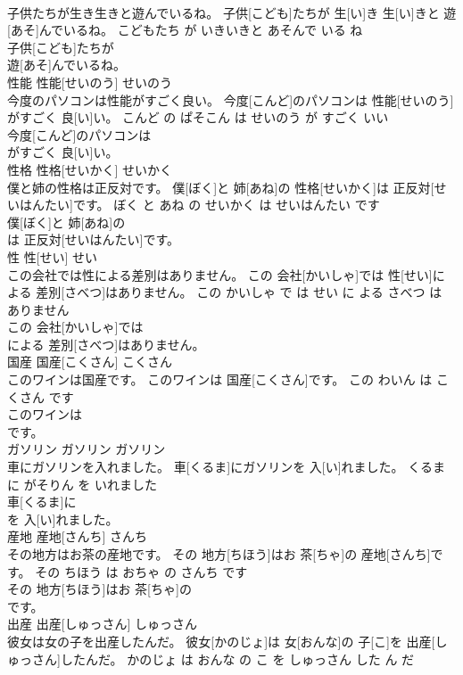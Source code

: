 \documentclass[8pt]{extreport}
\begin{document}
\begin{CJK}{UTF8}{min}
\\	子供たちが生き生きと遊んでいるね。	子供[こども]たちが 生[い]き 生[い]きと 遊[あそ]んでいるね。	こどもたち が いきいきと あそんで いる ね	
\\	子供[こども]たちが
\\	遊[あそ]んでいるね。			
\\	性能	性能[せいのう]	せいのう	
\\	今度のパソコンは性能がすごく良い。	今度[こんど]のパソコンは 性能[せいのう]がすごく 良[い]い。	こんど の ぱそこん は せいのう が すごく いい	
\\	今度[こんど]のパソコンは
\\	がすごく 良[い]い。			
\\	性格	性格[せいかく]	せいかく	
\\	僕と姉の性格は正反対です。	僕[ぼく]と 姉[あね]の 性格[せいかく]は 正反対[せいはんたい]です。	ぼく と あね の せいかく は せいはんたい です	
\\	僕[ぼく]と 姉[あね]の
\\	は 正反対[せいはんたい]です。			
\\	性	性[せい]	せい	
\\	この会社では性による差別はありません。	この 会社[かいしゃ]では 性[せい]による 差別[さべつ]はありません。	この かいしゃ で は せい に よる さべつ は ありません	
\\	この 会社[かいしゃ]では
\\	による 差別[さべつ]はありません。			
\\	国産	国産[こくさん]	こくさん	
\\	このワインは国産です。	このワインは 国産[こくさん]です。	この わいん は こくさん です	
\\	このワインは
\\	です。			
\\	ガソリン	ガソリン	ガソリン	
\\	車にガソリンを入れました。	車[くるま]にガソリンを 入[い]れました。	くるま に がそりん を いれました	
\\	車[くるま]に
\\	を 入[い]れました。			
\\	産地	産地[さんち]	さんち	
\\	その地方はお茶の産地です。	その 地方[ちほう]はお 茶[ちゃ]の 産地[さんち]です。	その ちほう は おちゃ の さんち です	
\\	その 地方[ちほう]はお 茶[ちゃ]の
\\	です。			
\\	出産	出産[しゅっさん]	しゅっさん	
\\	彼女は女の子を出産したんだ。	彼女[かのじょ]は 女[おんな]の 子[こ]を 出産[しゅっさん]したんだ。	かのじょ は おんな の こ を しゅっさん した ん だ	

\end{CJK}
\end{document}
